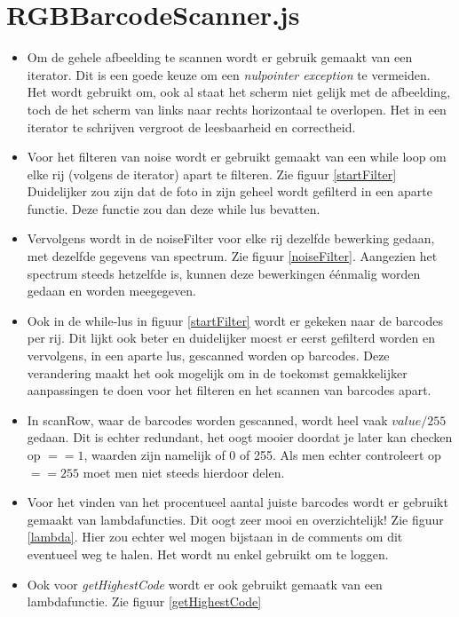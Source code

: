 \documentclass[a4paper,11pt]{article}
\begin{document}
\section{RGBBarcodeScanner.js}
\begin{itemize}
	\item Om de gehele afbeelding te scannen wordt er gebruik gemaakt van een iterator. Dit is een goede keuze om een {\it nulpointer exception} te vermeiden. Het wordt gebruikt om, ook al staat het scherm niet gelijk met de afbeelding, toch de het scherm van links naar rechts horizontaal te overlopen. Het in een iterator te schrijven vergroot de leesbaarheid en correctheid.
	\item Voor het filteren van noise wordt er gebruikt gemaakt van een while loop om elke rij (volgens de iterator) apart te filteren. Zie figuur \ref{startFilter} Duidelijker zou zijn dat de foto in zijn geheel wordt gefilterd in een aparte functie. Deze functie zou dan deze while lus bevatten.
	\item Vervolgens wordt in de noiseFilter voor elke rij dezelfde bewerking gedaan, met dezelfde gegevens van spectrum. Zie figuur \ref{noiseFilter}. Aangezien het spectrum steeds hetzelfde is, kunnen deze bewerkingen éénmalig worden gedaan en worden meegegeven.
	\item Ook in de while-lus in figuur \ref{startFilter} wordt er gekeken naar de barcodes per rij. Dit lijkt ook beter en duidelijker moest er eerst gefilterd worden en vervolgens, in een aparte lus, gescanned worden op barcodes. Deze verandering maakt het ook mogelijk om in de toekomst gemakkelijker aanpassingen te doen voor het filteren en het scannen van barcodes apart.
	\item In scanRow, waar de barcodes worden gescanned, wordt heel vaak $ value / 255$ gedaan. Dit is echter redundant, het oogt mooier doordat je later kan checken op $==1$, waarden zijn namelijk of 0 of 255. Als men echter controleert op $==255$ moet men niet steeds hierdoor delen.
	\item Voor het vinden van het procentueel aantal juiste barcodes wordt er gebruikt gemaakt van lambdafuncties. Dit oogt zeer mooi en overzichtelijk! Zie figuur \ref{lambda}. Hier zou echter wel mogen bijstaan in de comments om dit eventueel weg te halen. Het wordt nu enkel gebruikt om te loggen.
	\item Ook voor {\it getHighestCode} wordt er ook gebruikt gemaatk van een lambdafunctie. Zie figuur \ref{getHighestCode}
\end{itemize}
\end{document}
